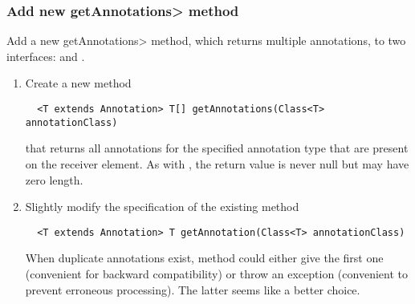 \documentclass[10pt]{article}
\begin{document}
\subsubsection{Add new \<getAnnotations> method\label{duplicate-annotations-getAnnotations}}

Add a new \<getAnnotations> method, which returns multiple annotations,
to two interfaces:  and
.

\begin{enumerate}

\item
Create a new method

\begin{Verbatim}
  <T extends Annotation> T[] getAnnotations(Class<T> annotationClass)
\end{Verbatim}


\noindent
that returns all annotations for the specified annotation type that are
present on the receiver element.  As with ,
the return value is never null but may have zero length.

\item
Slightly modify the specification of the existing method

\begin{Verbatim}
  <T extends Annotation> T getAnnotation(Class<T> annotationClass)
\end{Verbatim}

\noindent
When duplicate annotations exist, method  could either
give the first one (convenient for backward compatibility) or throw an
exception (convenient to prevent erroneous processing).  The latter seems
like a better choice.


\end{enumerate}
\end{document}
